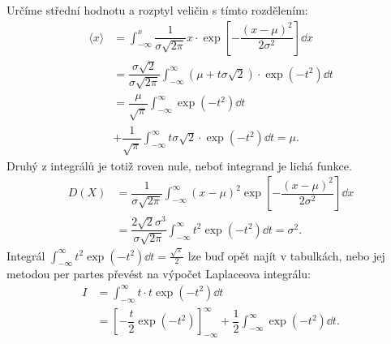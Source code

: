 \begin{mdframed}[style=mdexam]
\begin{example}
  {\centering
    \captionsetup{type=figure}
                   \newline
  \par}
  \vspace*{10px} Určíme střední hodnotu a rozptyl veličin s tímto rozdělením:
  \begin{align*}
    \langle x \rangle 
      &= \int_{-\infty}^{x}\dfrac{1}{\sigma\sqrt{2\pi}}x\cdot
         \exp\left[-\dfrac{(x-\mu)^2}{2\sigma^2}\right]\dd{x}                                     \\
      &= \dfrac{\sigma\sqrt{2}}{\sigma\sqrt{2\pi}}
         \int_{-\infty}^{\infty}\left(\mu+t\sigma\sqrt{2}\right)\cdot\exp\left(-t^2\right)\dd{t}  \\
      &= \dfrac{\mu}{\sqrt{\pi}}\int_{-\infty}^{\infty}\exp\left(-t^2\right)\dd{t}                \\
      &+ \dfrac{1}{\sqrt{\pi}}\int_{-\infty}^{\infty}t\sigma\sqrt{2}\cdot\exp\left(-t^2\right)\dd{t}
       =\mu.
  \end{align*}
  Druhý z integrálů je totiž roven nule, neboť integrand je lichá funkce.
  \begin{align*}
    D(X)  &= \dfrac{1}{\sigma\sqrt{2\pi}}\int_{-\infty}^{\infty}\left(x - \mu\right)^2 
             \exp\left[-\dfrac{(x-\mu)^2}{2\sigma^2}\right]\dd{x}                                \\
          &= \dfrac{2\sqrt{2}\sigma^3}{\sigma\sqrt{2\pi}}
             \int_{-\infty}^{\infty}t^2\exp\left(-t^2\right)\dd{t}
           = \sigma^2.
  \end{align*}
  Integrál \(\int_{-\infty}^{\infty}t^2\exp\left(-t^2\right)\dd{t} = \frac{\sqrt{\pi}}{2}\) lze buď 
  opět najít v tabulkách, nebo jej metodou per partes převést na výpočet Laplaceova integrálu:
  \begin{align*}
    I &= \int_{-\infty}^{\infty}t\cdot t\exp\left(-t^2\right)\dd{t}         \\
      &= \left[-\dfrac{t}{2}\exp\left(-t^2\right)\right]_{-\infty}^{\infty}
       + \dfrac{1}{2}\int_{-\infty}^{\infty}\exp\left(-t^2\right)\dd{t}.
  \end{align*}
  

\end{example}
\end{mdframed}
